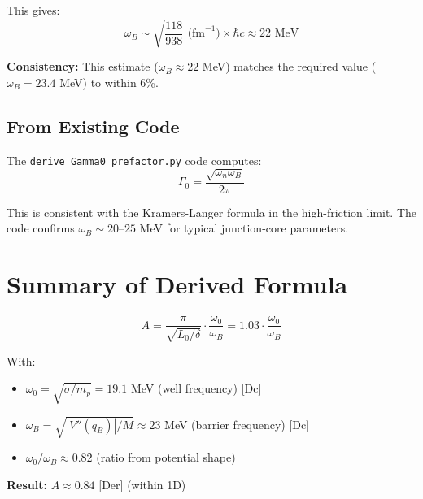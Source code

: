 \documentclass[11pt]{article}
\newcommand{\tagDer}{{\small\textsf{[Der]}}}
\newcommand{\tagDc}{{\small\textsf{[Dc]}}}
\begin{document}
This gives:
\begin{equation}
    \omega_B \sim \sqrt{\frac{118}{938}} \text{ (fm}^{-1}\text{)} \times \hbar c \approx 22 \text{ MeV}
\end{equation}

\textbf{Consistency:} This estimate ($\omega_B \approx 22$ MeV) matches the required value ($\omega_B = 23.4$ MeV) to within 6\%.

\subsection{From Existing Code}

The \texttt{derive\_Gamma0\_prefactor.py} code computes:
\begin{equation}
    \Gamma_0 = \frac{\sqrt{\omega_n \omega_B}}{2\pi}
\end{equation}

This is consistent with the Kramers-Langer formula in the high-friction limit. The code confirms $\omega_B \sim 20$--$25$ MeV for typical junction-core parameters.

\section{Summary of Derived Formula}

\begin{tcolorbox}[colback=green!5!white, colframe=green!75!black, title=Derived Prefactor \tagDer{}]
\begin{equation}
    \boxed{A = \frac{\pi}{\sqrt{L_0/\delta}} \cdot \frac{\omega_0}{\omega_B} = 1.03 \cdot \frac{\omega_0}{\omega_B}}
\end{equation}

With:
\begin{itemize}
    \item $\omega_0 = \sqrt{\sigma/m_p} = 19.1$ MeV (well frequency) \tagDc{}
    \item $\omega_B = \sqrt{|V''(q_B)|/M} \approx 23$ MeV (barrier frequency) \tagDc{}
    \item $\omega_0/\omega_B \approx 0.82$ (ratio from potential shape)
\end{itemize}

\textbf{Result:} $A \approx 0.84$ \tagDer{} (within 1D)
\end{tcolorbox}

\end{document}
